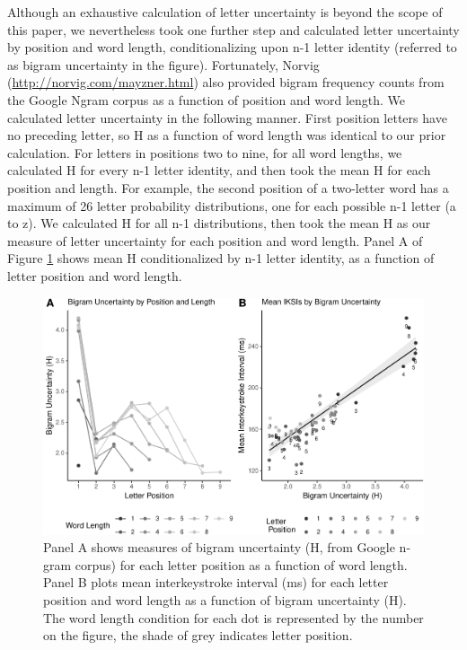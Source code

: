 \documentclass[,man,donotrepeattitle,floatsintext]{apa6}
\begin{document}
Although an exhaustive calculation of letter uncertainty is beyond the scope of this paper, we nevertheless took one further step and calculated letter uncertainty by position and word length, conditionalizing upon n-1 letter identity (referred to as bigram uncertainty in the figure). Fortunately, Norvig (\url{http://norvig.com/mayzner.html}) also provided bigram frequency counts from the Google Ngram corpus as a function of position and word length. We calculated letter uncertainty in the following manner. First position letters have no preceding letter, so H as a function of word length was identical to our prior calculation. For letters in positions two to nine, for all word lengths, we calculated H for every n-1 letter identity, and then took the mean H for each position and length. For example, the second position of a two-letter word has a maximum of 26 letter probability distributions, one for each possible n-1 letter (a to z). We calculated H for all n-1 distributions, then took the mean H as our measure of letter uncertainty for each position and word length. Panel A of Figure \ref{fig:letter-uncertainty-bigram} shows mean H conditionalized by n-1 letter identity, as a function of letter position and word length.



\begin{figure}
\centering
\includegraphics{Entropy_typing_draft_files/figure-latex/letter-uncertainty-bigram-1.pdf}
\caption{\label{fig:letter-uncertainty-bigram}Panel A shows measures of bigram uncertainty (H, from Google n-gram corpus) for each letter position as a function of word length. Panel B plots mean interkeystroke interval (ms) for each letter position and word length as a function of bigram uncertainty (H). The word length condition for each dot is represented by the number on the figure, the shade of grey indicates letter position.}
\end{figure}
\end{document}
